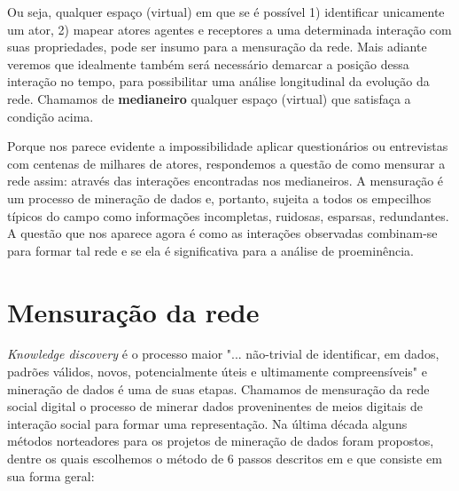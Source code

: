 \documentclass{article}
\begin{document}
Ou seja, qualquer espaço (virtual) em que se é possível 1) identificar
unicamente um ator, 2) mapear atores agentes e receptores a uma determinada
interação com suas propriedades, pode ser insumo para a mensuração da rede. Mais
adiante veremos que idealmente também será necessário demarcar a posição dessa
interação no tempo, para possibilitar uma análise longitudinal da evolução da
rede. Chamamos de \textbf{medianeiro} qualquer espaço (virtual) que satisfaça a
condição acima.

Porque nos parece evidente a impossibilidade aplicar questionários ou entrevistas
com centenas de milhares de atores, respondemos a questão de como mensurar a rede
assim: através das interações encontradas nos medianeiros. A mensuração é um
processo de mineração de dados e, portanto, sujeita a todos os empecilhos típicos
do campo como informações incompletas, ruidosas, esparsas, redundantes. A questão
que nos aparece agora é como as interações observadas combinam-se para formar tal
rede e se ela é significativa para a análise de proeminência.

\section{Mensuração da rede}

\textit{Knowledge discovery} é o processo maior "... não-trivial de identificar,
em dados, padrões válidos, novos, potencialmente úteis e ultimamente
compreensíveis" \cite{Fayyad1996} e mineração de dados é uma de suas etapas.
Chamamos de mensuração da rede social digital o processo de minerar dados
proveninentes de meios digitais de interação social para formar uma
representação. Na última década alguns métodos norteadores para os projetos de
mineração de dados foram propostos, dentre os quais escolhemos o método de 6
passos descritos em \cite{Cios2005} e que consiste em sua forma geral:
\end{document}
